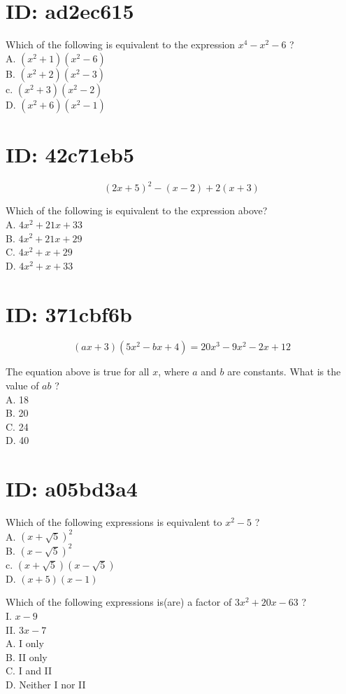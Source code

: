 \section*{ID: ad2ec615}
Which of the following is equivalent to the expression $x^{4}-x^{2}-6$ ?\\
A. $\left(x^{2}+1\right)\left(x^{2}-6\right)$\\
B. $\left(x^{2}+2\right)\left(x^{2}-3\right)$\\
c. $\left(x^{2}+3\right)\left(x^{2}-2\right)$\\
D. $\left(x^{2}+6\right)\left(x^{2}-1\right)$

\section*{ID: 42c71eb5}
$$
(2 x+5)^{2}-(x-2)+2(x+3)
$$

Which of the following is equivalent to the expression above?\\
A. $4 x^{2}+21 x+33$\\
B. $4 x^{2}+21 x+29$\\
C. $4 x^{2}+x+29$\\
D. $4 x^{2}+x+33$

\section*{ID: 371cbf6b}
$$
(a x+3)\left(5 x^{2}-b x+4\right)=20 x^{3}-9 x^{2}-2 x+12
$$

The equation above is true for all $x$, where $a$ and $b$ are constants. What is the value of $a b$ ?\\
A. 18\\
B. 20\\
C. 24\\
D. 40

\section*{ID: a05bd3a4}
Which of the following expressions is equivalent to $x^{2}-5$ ?\\
A. $(x+\sqrt{5})^{2}$\\
B. $(x-\sqrt{5})^{2}$\\
c. $(x+\sqrt{5})(x-\sqrt{5})$\\
D. $(x+5)(x-1)$

Which of the following expressions is(are) a factor of $3 x^{2}+20 x-63$ ?\\
I. $x-9$\\
II. $3 x-7$\\
A. I only\\
B. II only\\
C. I and II\\
D. Neither I nor II

